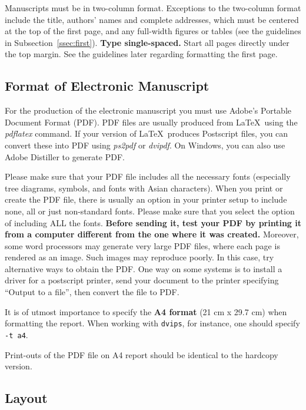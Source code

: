\documentclass[11pt]{article}
\begin{document}
Manuscripts must be in two-column format.  Exceptions to the
two-column format include the title, authors' names and complete
addresses, which must be centered at the top of the first page, and
any full-width figures or tables (see the guidelines in
Subsection~\ref{ssec:first}). {\bf Type single-spaced.}  Start all
pages directly under the top margin. See the guidelines later
regarding formatting the first page.

\subsection{Format of Electronic Manuscript}
\label{sect:pdf}

For the production of the electronic manuscript you must use Adobe's
Portable Document Format (PDF). PDF files are usually produced from
\LaTeX\ using the \textit{pdflatex} command. If your version of
\LaTeX\ produces Postscript files, you can convert these into PDF
using \textit{ps2pdf} or \textit{dvipdf}. On Windows, you can also use
Adobe Distiller to generate PDF.

Please make sure that your PDF file includes all the necessary fonts
(especially tree diagrams, symbols, and fonts with Asian
characters). When you print or create the PDF file, there is usually
an option in your printer setup to include none, all or just
non-standard fonts.  Please make sure that you select the option of
including ALL the fonts. \textbf{Before sending it, test your PDF by
  printing it from a computer different from the one where it was
  created.} Moreover, some word processors may generate very large PDF
files, where each page is rendered as an image. Such images may
reproduce poorly. In this case, try alternative ways to obtain the
PDF. One way on some systems is to install a driver for a postscript
printer, send your document to the printer specifying ``Output to a
file'', then convert the file to PDF.

It is of utmost importance to specify the \textbf{A4 format} (21 cm
x 29.7 cm) when formatting the report. When working with
{\tt dvips}, for instance, one should specify {\tt -t a4}.

Print-outs of the PDF file on A4 report should be identical to the
hardcopy version.


\subsection{Layout}
\label{ssec:layout}
\end{document}
